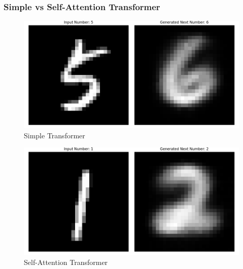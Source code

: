 \begin{frame}
    \frametitle{Simple vs Self-Attention Transformer}
    \begin{figure}
        \centering
        \includegraphics[height=0.35\textheight]{media/3rdAssignment/Simple.png}
        \vspace{-0.35cm}
        \caption{Simple Transformer}
    \end{figure}
    \vspace{-0.35cm}
    \begin{figure}
        \centering
        \includegraphics[height=0.35\textheight]{media/3rdAssignment/Self_attention.png}
        \vspace{-0.35cm}
        \caption{Self-Attention Transformer}
    \end{figure}
\end{frame}

